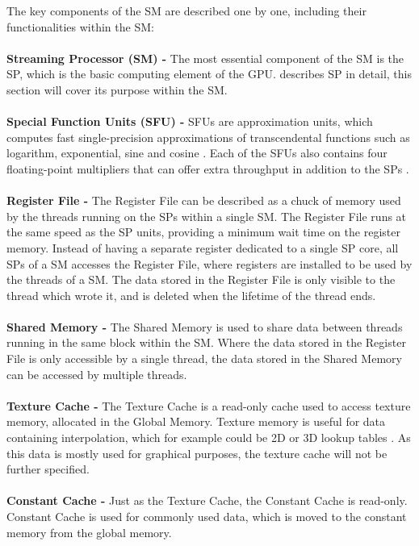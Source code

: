 The key components of the SM are described one by one, including their functionalities within the SM:
\\\\
\textbf{Streaming Processor (SM) -}  The most essential component of the SM is the SP, which is the basic computing element of the GPU.
 describes SP in detail, this section will cover its purpose within the SM.
\\\\	
\textbf{Special Function Units (SFU) -} SFUs are approximation units, which computes fast single-precision approximations of transcendental functions such as logarithm, exponential, sine and cosine \cite{Wilt2013}.
Each of the SFUs also contains four floating-point multipliers that can offer extra throughput in addition to the SPs \cite{Li2016}.
\\\\	
\textbf{Register File -} The Register File can be described as a chuck of memory used by the threads running on the SPs within a single SM. 
The Register File runs at the same speed as the SP units, providing a minimum wait time on the register memory. 
Instead of having a separate register dedicated to a single SP core, all SPs of a SM accesses the Register File, where registers are installed to be used by the threads of a SM.
The data stored in the Register File is only visible to the thread which wrote it, and is deleted when the lifetime of the thread ends.
\\\\	
\textbf{Shared Memory -} The Shared Memory is used to share data between threads running in the same block within the SM.
Where the data stored in the Register File is only accessible by a single thread, the data stored in the Shared Memory can be accessed by multiple threads.
\\\\		
\textbf{Texture Cache -} The Texture Cache is a read-only cache used to access texture memory, allocated in the Global Memory.
Texture memory is useful for data containing interpolation, which for example could be 2D or 3D lookup tables \cite{Cook2008}.
As this data is mostly used for graphical purposes, the texture cache will not be further specified.
\\\\	
\textbf{Constant Cache -} Just as the Texture Cache, the Constant Cache is read-only.
Constant Cache is used for commonly used data, which is moved to the constant memory from the global memory.
